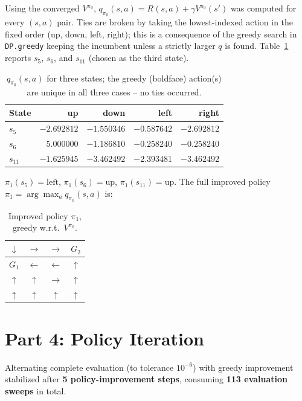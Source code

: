\documentclass[11pt]{article}
\begin{document}
Using the converged $V^{\pi_0}$, $q_{\pi_0}(s,a) = R(s,a) + \gamma V^{\pi_0}(s')$
was computed for every $(s,a)$ pair. Ties are broken by taking the
lowest-indexed action in the fixed order (up, down, left, right); this is a
consequence of the greedy search in \texttt{DP.greedy} keeping the incumbent
unless a strictly larger $q$ is found. Table~\ref{tab:q} reports $s_5$, $s_6$,
and $s_{11}$ (chosen as the third state).

\begin{table}[h]
\centering
\begin{tabular}{lrrrr}
\toprule
State & up & down & left & right \\
\midrule
$s_5$  & $-2.692812$ & $-1.550346$ & $\mathbf{-0.587642}$ & $-2.692812$ \\
$s_6$  & $\mathbf{5.000000}$ & $-1.186810$ & $-0.258240$ & $-0.258240$ \\
$s_{11}$ & $\mathbf{-1.625945}$ & $-3.462492$ & $-2.393481$ & $-3.462492$ \\
\bottomrule
\end{tabular}
\caption{$q_{\pi_0}(s,a)$ for three states; the greedy (boldface) action(s)
are unique in all three cases -- no ties occurred.}
\label{tab:q}
\end{table}

$\pi_1(s_5) = \text{left}$, $\pi_1(s_6) = \text{up}$, $\pi_1(s_{11}) = \text{up}$.
The full improved policy $\pi_1 = \arg\max_a q_{\pi_0}(s,a)$ is:

\begin{table}[h]
\centering
\begin{tabular}{|C|C|C|C|}
\hline
$\downarrow$ & $\rightarrow$ & $\rightarrow$ & $G_2$ \\ \hline
$G_1$ & $\leftarrow$ & $\leftarrow$ & $\uparrow$ \\ \hline
$\uparrow$ & $\uparrow$ & $\rightarrow$ & $\uparrow$ \\ \hline
$\uparrow$ & $\uparrow$ & $\uparrow$ & $\uparrow$ \\ \hline
\end{tabular}
\caption{Improved policy $\pi_1$, greedy w.r.t.\ $V^{\pi_0}$.}
\end{table}

\section{Part 4: Policy Iteration}

Alternating complete evaluation (to tolerance $10^{-6}$) with greedy
improvement stabilized after \textbf{5 policy-improvement steps}, consuming
\textbf{113 evaluation sweeps} in total.
\end{document}
